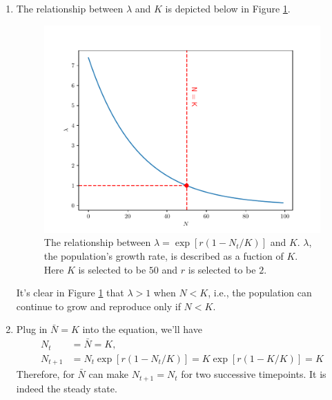 \begin{homeworkProblem}[4]
\begin{enumerate}
\item The relationship between $\lambda$ and $K$ is depicted below in Figure 
\ref{fig:fig4a}.
\begin{figure}
    \centering
    \caption[The relationship between $\lambda$]{
        The relationship between $\lambda = \exp[r(1-N_t/K)]$ and $K$. 
        $\lambda$, the population's growth rate, is described as a fuction of 
        $K$. Here $K$ is selected to be $50$ and $r$ is selected to be $2$.
    }
    \label{fig:fig4a}
    \includegraphics[scale=0.6]{../fig/fig4(a).pdf}
\end{figure}
It's clear in Figure \ref{fig:fig4a} that $\lambda > 1$ when $N < K$, i.e., the 
population can continue to grow and reproduce only if $N < K$.

\item Plug in $\bar N = K$ into the equation, we'll have \[
    \begin{aligned}
        N_t &= \bar N = K,\\
        N_{t+1} &= N_t \exp[r(1-N_t/K)] = K \exp[r(1-K/K)] = K
    \end{aligned}
\]
Therefore, for $\bar N$ can make $N_{t+1} = N_t$ for two successive timepoints.
It is indeed the steady state.


\end{enumerate}
\end{homeworkProblem}
